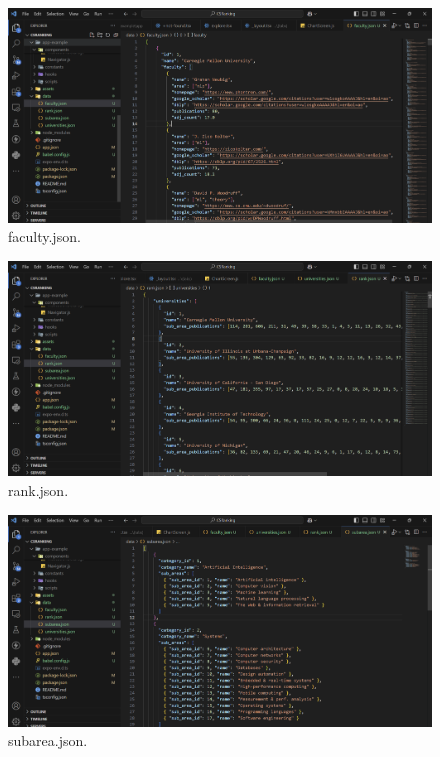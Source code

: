 \documentclass[12pt]{article}
\begin{document}
\begin{figure}[H]
    \centering
    \includegraphics[width=\textwidth]{json1.png} %
    \caption{faculty.json.}
    \label{fig:example_image}
\end{figure}

\begin{figure}[H]
    \centering
    \includegraphics[width=\textwidth]{json2.png} %
    \caption{rank.json.}
    \label{fig:example_image}
\end{figure}

\begin{figure}[H]
    \centering
    \includegraphics[width=\textwidth]{json3.png} %
    \caption{subarea.json.}
    \label{fig:example_image}
\end{figure}
\end{document}
